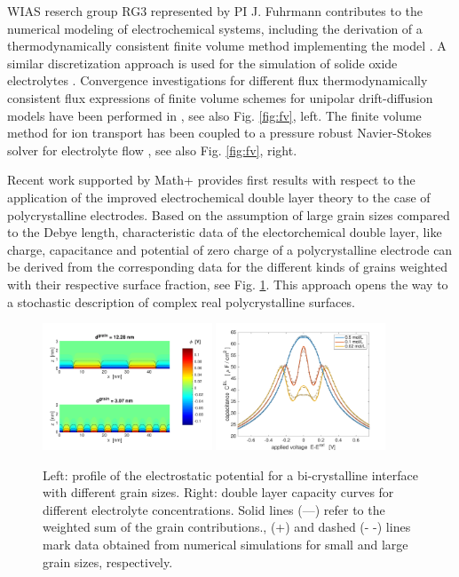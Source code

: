 \documentclass[a4paper,10pt]{article}
\begin{document}
WIAS reserch group RG3 represented by PI J. Fuhrmann contributes to the numerical modeling of electrochemical systems,
including the derivation of a thermodynamically consistent finite volume  method \cite{JF2016} implementing
the model \cite{DGL2014}. A similar discretization approach is used for the simulation
of solide oxide electrolytes \cite{VagnerEtAl2019}. Convergence investigations for different flux
thermodynamically consistent flux expressions of  finite volume
schemes for unipolar drift-diffusion models  have been  performed in \cite{CCFG2020}, see also Fig. \ref{fig:fv}, left. The finite volume method for
ion transport has been coupled to a pressure robust Navier-Stokes solver for electrolyte flow
\cite{FGLMMSpringer2019,FuhrmannEtAlECActa2019}, see also Fig. \ref{fig:fv}, right.

Recent work  supported by  Math+  \cite{JES} provides first  results with
respect to the application of the improved electrochemical double layer
theory to the case of polycrystalline  electrodes. Based on the assumption of large
grain sizes compared to the Debye length, characteristic data of the electorchemical double layer,
like charge, capacitance and potential of zero charge of a polycrystalline electrode can be derived from  the corresponding data
for the different kinds of grains weighted with their respective surface fraction,
see Fig. \ref{fig:JES}. This approach opens the way to
a stochastic description of complex real polycrystalline surfaces.

\begin{figure}
  \centering
  \includegraphics[width=0.45\textwidth]{phi_poly2d_gran.pdf}
  \includegraphics[width=0.45\textwidth]{c_2d_grain.pdf}
  \caption{Left: profile of the electrostatic potential for a bi-crystalline interface with different
    grain sizes.
    Right: double layer capacity curves for different electrolyte concentrations.
    Solid lines (—) refer to the weighted sum of the grain contributions.,
    (+) and dashed (- -) lines mark data obtained from numerical simulations for
    small and large grain sizes, respectively.
 \label{fig:JES}}
\end{figure}
\end{document}
